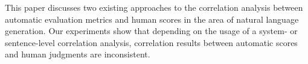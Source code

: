 This paper discusses two existing approaches to the correlation analysis between automatic evaluation metrics and human scores in the area of natural language generation. Our experiments show that depending on the usage of a system- or sentence-level correlation analysis, correlation results between automatic scores and human judgments are inconsistent.
